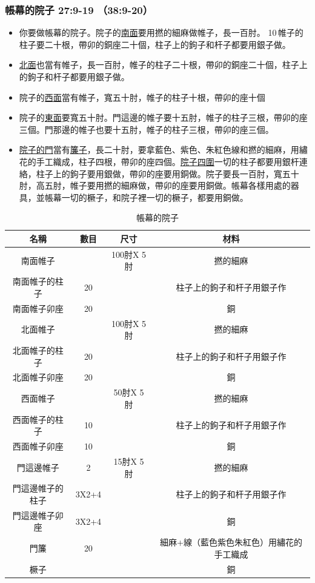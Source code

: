 \subsubsection{帳幕的院子 27:9-19 （38:9-20）}
\begin{itemize} 
\itemsep-.35em
\item 你要做帳幕的院子。院子的\underline{南面}要用撚的細麻做帷子，長一百肘。 10 帷子的柱子要二十根，帶卯的銅座二十個，柱子上的鉤子和杆子都要用銀子做。 
\item \underline{北面}也當有帷子，長一百肘，帷子的柱子二十根，帶卯的銅座二十個，柱子上的鉤子和杆子都要用銀子做。
\item 院子的\underline{西面}當有帷子，寬五十肘，帷子的柱子十根，帶卯的座十個
\item 院子的\underline{東面}要寬五十肘。門這邊的帷子要十五肘，帷子的柱子三根，帶卯的座三個。門那邊的帷子也要十五肘，帷子的柱子三根，帶卯的座三個。
\item \underline{院子的門}當有\underline{簾子}，長二十肘，要拿藍色、紫色、朱紅色線和撚的細麻，用繡花的手工織成，柱子四根，帶卯的座四個。\underline{院子四圍}一切的柱子都要用銀杆連絡，柱子上的鉤子要用銀做，帶卯的座要用銅做。院子要長一百肘，寬五十肘，高五肘，帷子要用撚的細麻做，帶卯的座要用銅做。帳幕各樣用處的器具，並帳幕一切的橛子，和院子裡一切的橛子，都要用銅做。
\end{itemize}

\begin{table}[H]
\centering
\begin{tabular}{|c|c|c|c| }
\hline
\hline
 名稱   & 數目& 尺寸     & 材料  \\\hline
南面帷子&       &100肘X 5肘    &撚的細麻\\\hline
南面帷子的柱子&  20    & &柱子上的鉤子和杆子用銀子作\\\hline
南面帷子卯座&  20    &  &銅\\\hline

北面帷子&       &100肘X 5肘  &撚的細麻\\\hline
北面帷子的柱子&  20    & &柱子上的鉤子和杆子用銀子作\\\hline
北面帷子卯座&  20    &  &銅\\\hline

西面帷子&       &50肘X 5肘  &撚的細麻\\\hline
西面帷子的柱子&  10    & &柱子上的鉤子和杆子用銀子作\\\hline
西面帷子卯座&  10    &  &銅\\\hline

門這邊帷子&   2    &15肘X 5肘  &撚的細麻\\\hline
門這邊帷子的柱子&  3X2+4    & &柱子上的鉤子和杆子用銀子作\\\hline
門這邊帷子卯座& 3X2+4 &  &銅\\\hline
門簾&  20    &  &細麻+線（藍色紫色朱紅色）用繡花的手工織成\\\hline
橛子& &  &銅\\\hline
\end{tabular}
\caption{帳幕的院子}
\end{table}


